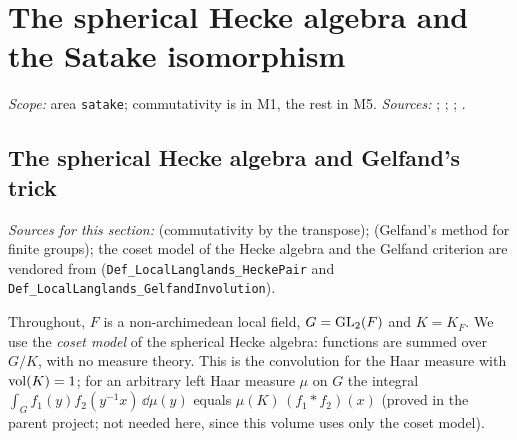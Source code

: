 
\chapter{The spherical Hecke algebra and the Satake isomorphism}\label{ch:ch-1-01-spherical}

\noindent\emph{Scope:} area \texttt{satake}; commutativity is in M1, the rest in M5. \emph{Sources:} \cite{Sat}; \cite[§9, Proposition~37]{BumpH}; \cite[§9]{Cas-p}; \cite{Corv-ptI-7}.

\section{The spherical Hecke algebra and Gelfand's trick}\label{sec:satake-gelfand}

{\sloppy\noindent\emph{Sources for this section:} \cite[§9, Theorem~12, pp.~50--51]{BumpH} (commutativity by the transpose);
\cite[§2, Theorem~5, p.~14]{BumpH} (Gelfand's method for finite groups); the coset model of the Hecke algebra and the
Gelfand criterion are vendored from \cite{AFLT} (\texttt{Def\_LocalLanglands\_\allowbreak HeckePair} and
\texttt{Def\_LocalLanglands\_\allowbreak GelfandInvolution}).\par}

Throughout, $F$ is a non-archimedean local field, $G=\mathrm{GL}_2(F)$ and $K=K_F$. We use the \emph{coset model} of the
spherical Hecke algebra: functions are summed over $G/K$, with no measure theory. This is the convolution for the Haar
measure with $\operatorname{vol}(K)=1$; for an arbitrary left Haar measure $\mu$ on $G$ the integral
$\int_Gf_1(y)f_2(y^{-1}x)\,\dd\mu(y)$ equals $\mu(K)\,(f_1*f_2)(x)$ (proved in the parent
project; not needed here, since this volume uses only the coset model).

\begin{definition}
\end{definition}

